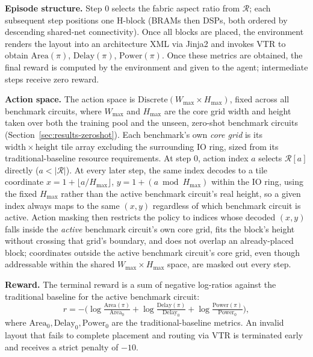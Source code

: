 \documentclass[sigconf]{acmart}
\begin{document}
\textbf{Episode structure.} Step 0 selects the fabric aspect ratio from
$\mathcal{R}$; each subsequent step positions one H-block (BRAMs then DSPs,
both ordered by descending shared-net connectivity). Once all blocks are placed,
the environment renders the layout into an architecture XML via Jinja2 and invokes
VTR to obtain $\mathrm{Area}(\pi)$, $\mathrm{Delay}(\pi)$, $\mathrm{Power}(\pi)$. Once these metrics are obtained, the final reward is computed by the environment and given to the agent;
intermediate steps receive zero reward.

\textbf{Action space.} The action space is $\mathrm{Discrete}(W_{\max} \times
H_{\max})$, fixed across all benchmark circuits, where $W_{\max}$ and
$H_{\max}$ are the core grid width and height taken over both the training
pool and the unseen, zero-shot benchmark circuits (Section~\ref{sec:results-zeroshot}). Each benchmark's own
\emph{core grid} is its $\mathrm{width} \times \mathrm{height}$ tile array
excluding the surrounding IO ring, sized from its traditional-baseline
resource requirements. At step 0, action index
$a$ selects $\mathcal{R}[a]$ directly ($a < |\mathcal{R}|$).
At every later step, the same index decodes to a tile coordinate
$x = 1 + \lfloor a / H_{\max} \rfloor$, $y = 1 + (a \bmod H_{\max})$ within
the IO ring, using the fixed $H_{\max}$ rather than the active benchmark
circuit's real height, so a given index always maps to the same $(x,y)$
regardless of which benchmark circuit is active. Action masking then
restricts the policy to indices whose decoded $(x,y)$ falls inside the
\emph{active} benchmark circuit's own core grid, fits the block's height
without crossing that grid's boundary, and does not overlap an
already-placed block; coordinates outside the active benchmark circuit's
core grid, even though addressable within the shared
$W_{\max} \times H_{\max}$ space, are masked out every step.

\textbf{Reward.} The terminal reward is a sum of negative log-ratios
against the traditional baseline for the active benchmark circuit:
\begin{equation}
\label{eq:reward}
  r = -\Big(
    \log\tfrac{\mathrm{Area}(\pi)}{\mathrm{Area}_0} +
    \log\tfrac{\mathrm{Delay}(\pi)}{\mathrm{Delay}_0} +
    \log\tfrac{\mathrm{Power}(\pi)}{\mathrm{Power}_0}
  \Big),
\end{equation}
where $\mathrm{Area}_0,\mathrm{Delay}_0,\mathrm{Power}_0$ are the
traditional-baseline metrics. An invalid layout that fails to complete
placement and routing via VTR is terminated early and receives a strict
penalty of $-10$.
\end{document}
